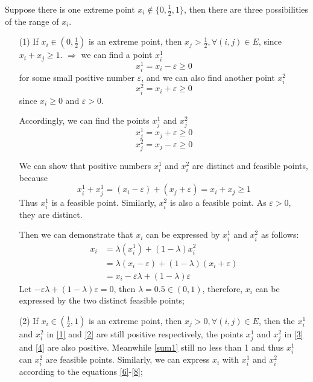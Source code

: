 \documentclass[a4paper,12pt]{article}
\begin{document}
Suppose there is one extreme point $x_i \notin \{0, \frac{1}{2}, 1\}$, then there are three possibilities of the range of $x_i$.
\begin{enumerate}
\item[(1) ] If $x_i \in (0, \frac{1}{2})$ is an extreme point, then $x_j > \frac{1}{2}, \forall (i,j) \in E$, since $x_i+x_j\geq 1$.
$\Rightarrow $ we can find a point $x_i^1$\\
\begin{equation}\label{1}
x_i^1=x_i-\varepsilon \geq 0
\end{equation} 
for some small positive number $\varepsilon$, and we can also find another point  $x_i^2$
\begin{equation}\label{2}
x_i^2=x_i+\varepsilon \geq 0
\end{equation} 
since $x_i \geq 0$ and $\varepsilon>0$. 

Accordingly, we can find the points $x_j^1$ and $x_j^2$ 
\begin{equation}\label{3}
x_j^1=x_j+\varepsilon \geq 0 
\end{equation}
\begin{equation}\label{4}
x_j^2=x_j-\varepsilon \geq 0
\end{equation}

We can show that positive numbers $x_i^1$ and $x_i^2$ are distinct and feasible points, because
\begin{equation}\label{sum1}
x_i^1+x_j^1= (x_i-\varepsilon)+ (x_j+\varepsilon)=x_i+ x_j\geq 1
\end{equation}
Thus $x_i^1$ is a feasible point. Similarly, $x_i^2$ is also a feasible point. As $\varepsilon > 0$, they are distinct.

Then we can demonstrate that $x_i$ can be expressed by $x_i^1$ and $x_i^2$ as follows:
\begin{align}\label{6}
x_i &=\lambda(x_i^1)+(1-\lambda)x_i^2 \\ 
 &=\lambda(x_i-\varepsilon)+(1-\lambda)(x_i+\varepsilon) \\ \label{8}
 & =x_i -\varepsilon \lambda +(1-\lambda) \varepsilon 
\end{align} 
Let $-\varepsilon \lambda +(1-\lambda) \varepsilon =0$, then $\lambda=0.5 \in (0,1)$, therefore, $x_i$ can be expressed by the two distinct feasible points;

\item[(2) ]If $x_i \in (\frac{1}{2},1)$ is an extreme point, then $x_j > 0, \forall (i,j) \in E$, then the $x_i^1$ and $x_i^2$ in \eqref{1} and  \eqref{2}  are still positive respectively, the points $x_j^1$ and $x_j^2$ in  \eqref{3} and \eqref{4} are also positive. Meanwhile \eqref{sum1}  still no less than 1 and thus $x_i^1$ can $x_i^2$ are feasible points. Similarly, we can express $x_i$ with $x_i^1$ and $x_i^2$ according to the equations \eqref{6}-\eqref{8};


\end{enumerate}
\end{document}
